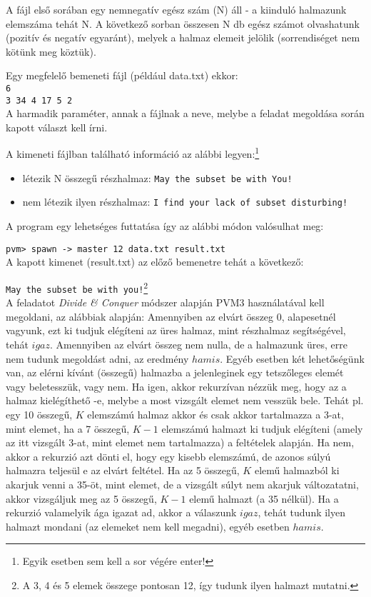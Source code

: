 \documentclass[12pt]{article}
\begin{document}
A fájl első sorában egy nemnegatív egész szám (N) áll - a kiinduló halmazunk elemszáma tehát N. A következő sorban összesen N db egész számot olvashatunk (pozitív és negatív egyaránt), melyek a halmaz elemeit jelölik (sorrendiséget nem kötünk meg köztük).

Egy megfelelő bemeneti fájl (például data.txt) ekkor: \\
\verb|6| \\
\verb|3 34 4 17 5 2 |\\
A harmadik paraméter, annak a fájlnak a neve, melybe a feladat megoldása során kapott választ kell írni.

A kimeneti fájlban található információ az alábbi legyen:\footnote{Egyik esetben sem kell a sor végére enter!}
\begin{itemize}
    \item létezik N összegű részhalmaz: \verb|May the subset be with You!|
    \item nem létezik ilyen részhalmaz: \verb|I find your lack of subset disturbing!|
\end{itemize}
A program egy lehetséges futtatása így az alábbi módon valósulhat meg:

\verb|pvm> spawn -> master 12 data.txt result.txt| \\
A kapott kimenet (result.txt) az előző bemenetre tehát a következő:

\verb|May the subset be with you!|\footnote{A 3, 4 és 5 elemek összege pontosan 12, így tudunk ilyen halmazt mutatni.} \\

A feladatot \textit{Divide \& Conquer} módszer alapján PVM3 használatával kell megoldani, az alábbiak alapján:
Amennyiben az elvárt összeg 0, alapesetnél vagyunk, ezt ki tudjuk elégíteni az üres halmaz, mint részhalmaz segítségével, tehát $igaz$.
Amennyiben az elvárt összeg nem nulla, de a halmazunk üres, erre nem tudunk megoldást adni, az eredmény $hamis$.
Egyéb esetben két lehetőségünk van, az elérni kívánt (összegű) halmazba a jelenleginek egy tetszőleges elemét vagy beletesszük, vagy nem.
Ha igen, akkor rekurzívan nézzük meg, hogy az a halmaz kielégíthető -e, melybe a most vizsgált elemet nem vesszük bele. Tehát pl. egy 10 összegű, $K$ elemszámú halmaz akkor és csak akkor tartalmazza a 3-at, mint elemet, ha a 7 összegű, $K-1$ elemszámú halmazt ki tudjuk elégíteni (amely az itt vizsgált 3-at, mint elemet nem tartalmazza) a feltételek alapján.
Ha nem, akkor a rekurzió azt dönti el, hogy egy kisebb elemszámú, de azonos súlyú halmazra teljesül e az elvárt feltétel. Ha az 5 összegű, $K$ elemű halmazból ki akarjuk venni a 35-öt, mint elemet, de a vizsgált súlyt nem akarjuk változatatni, akkor vizsgáljuk meg az 5 összegű, $K-1$ elemű halmazt (a 35 nélkül).
Ha a rekurzió valamelyik ága igazat ad, akkor a válaszunk $igaz$, tehát tudunk ilyen halmazt mondani (az elemeket nem kell megadni), egyéb esetben $hamis$.
\end{document}
